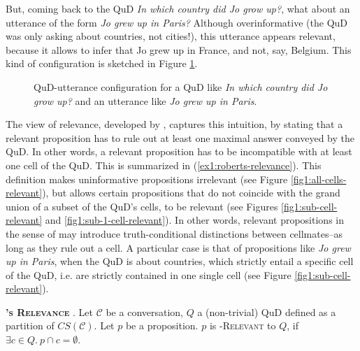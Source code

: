 But, coming back to the QuD \textit{In which country did Jo grow up?}, what about an utterance of the form \textit{Jo grew up in Paris?} Although overinformative (the QuD was only asking about countries, not cities!), this utterance appears relevant, because it allows to infer that Jo grew up in France, and not, say, Belgium. This kind of configuration is sketched in Figure \ref{fig1:relevance-example-2}.

\begin{figure}[H]
	\centering
	\caption{QuD-utterance configuration for a QuD like \textit{In which country did Jo grow up?} and an utterance like \textit{Jo grew up in Paris}.}\label{fig1:relevance-example-2}
\end{figure}

The view of relevance, developed by \citet{Roberts2012}, captures this intuition, by stating that a relevant proposition has to rule out at least one maximal answer conveyed by the QuD. In other words, a relevant proposition has to be incompatible with at least one cell of the QuD. This is summarized in (\ref{ex1:roberts-relevance}). This definition makes uninformative propositions irrelevant (see Figure \ref{fig1:all-cells-relevant}), but allows certain propositions that do not coincide with the grand union of a subset of the QuD's cells, to be relevant (see Figures \ref{fig1:sub-cell-relevant} and \ref{fig1:sub-1-cell-relevant}). In other words, relevant propositions in the sense of \citeauthor{Roberts2012} may introduce truth-conditional distinctions between cellmates--as long as they rule out a cell. A particular case is that of propositions like \textit{Jo grew up in Paris}, when the QuD is about countries, which strictly entail a specific cell of the QuD, i.e. are strictly contained in one single cell (see Figure \ref{fig1:sub-cell-relevant}).


\begin{exe}
	\ex\label{ex1:roberts-relevance} {\textsc{\textbf{\citeauthor{Roberts2012}'s Relevance}} \citep{Roberts2012}. Let $\mathcal{C}$ be a conversation, $Q$ a (non-trivial) QuD defined as a partition of $CS(\mathcal{C})$. Let $p$ be a proposition. $p$ is \textsc{\citeauthor{Roberts2012}-Relevant} to $Q$, if $\exists c \in Q. \ p \cap c = \emptyset$.
	}
\end{exe}


